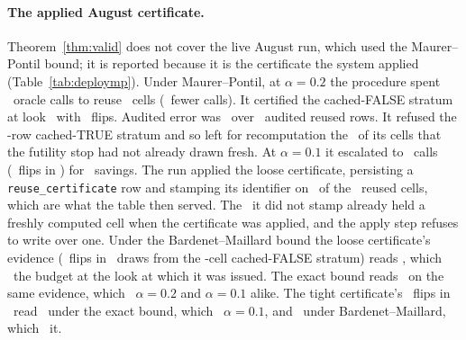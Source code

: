 \paragraph{The applied August certificate.} Theorem~\ref{thm:valid}
does not cover the live August run, which used the Maurer--Pontil
bound; it is reported because it is the certificate the system applied
(Table~\ref{tab:deploymp}). Under Maurer--Pontil, at $\alpha{=}0.2$
the procedure spent \deployMpOracle\ oracle calls to reuse
\deployMpReused\ cells (\deployMpSavings\ fewer calls). It
certified the cached-FALSE stratum at look \deployMpLookLoose\ with
\deployMpFlipsLoose\ flips. Audited error was \deployMpRealized\ over
\deployMpAuditRows\ audited reused rows. It refused the
\deployTrueStratum-row cached-TRUE stratum and so left for
recomputation the \deployRecompute\ of its cells that the futility stop
had not already drawn fresh. At $\alpha{=}0.1$ it escalated to
\deployMpOracleTight\ calls (\deployMpFlipsTight\ flips in
\deployMpLookTight) for \deployMpSavingsTight\ savings. The run applied
the loose certificate, persisting a \texttt{reuse\_certificate}
row and stamping its identifier on \deployStamped\ of the
\deployMpReused\ reused cells, which are what the table then
served. The \deployUnstamped\ it did not stamp already held a
freshly computed cell when the certificate was applied, and the apply
step refuses to write over one. Under the
Bardenet--Maillard bound the loose certificate's evidence
(\deployMpFlipsLoose\ flips in \deployMpLookLoose\ draws from the
\deployFalseStratum-cell cached-FALSE stratum) reads \deployWorLoose,
which \deployWorLooseClears\ the budget at the look at which it was
issued.
The exact bound reads \deployExactLoose\ on the same evidence, which
\deployExactLooseClears\ $\alpha{=}0.2$ and $\alpha{=}0.1$ alike. The
tight certificate's
\deployMpFlipsTight\ flips in \deployMpLookTight\ read
\deployExactTight\ under the exact bound, which
\deployExactTightClears\ $\alpha{=}0.1$, and \deployWorTight\ under
Bardenet--Maillard, which \deployWorTightClears\ it.

\keeprunin
